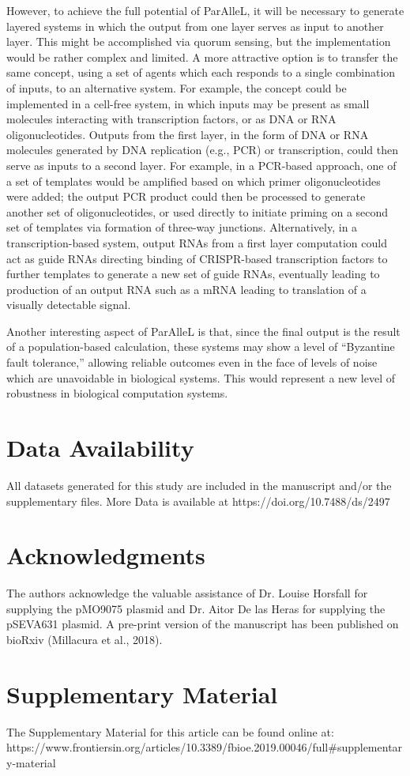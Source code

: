 However, to achieve the full potential of ParAlleL, it will be necessary to generate layered systems in which the output from one layer serves as input to another layer. This might be accomplished via quorum sensing, but the implementation would be rather complex and limited. A more attractive option is to transfer the same concept, using a set of agents which each responds to a single combination of inputs, to an alternative system. For example, the concept could be implemented in a cell-free system, in which inputs may be present as small molecules interacting with transcription factors, or as DNA or RNA oligonucleotides. Outputs from the first layer, in the form of DNA or RNA molecules generated by DNA replication (e.g., PCR) or transcription, could then serve as inputs to a second layer. For example, in a PCR-based approach, one of a set of templates would be amplified based on which primer oligonucleotides were added; the output PCR product could then be processed to generate another set of oligonucleotides, or used directly to initiate priming on a second set of templates via formation of three-way junctions. Alternatively, in a transcription-based system, output RNAs from a first layer computation could act as guide RNAs directing binding of CRISPR-based transcription factors to further templates to generate a new set of guide RNAs, eventually leading to production of an output RNA such as a mRNA leading to translation of a visually detectable signal.

Another interesting aspect of ParAlleL is that, since the final output is the result of a population-based calculation, these systems may show a level of “Byzantine fault tolerance,” allowing reliable outcomes even in the face of levels of noise which are unavoidable in biological systems. This would represent a new level of robustness in biological computation systems.

\section{\textbf{Data Availability}}
All datasets generated for this study are included in the manuscript and/or the supplementary files. More Data is available at https://doi.org/10.7488/ds/2497

\section{\textbf{Acknowledgments}}

The authors acknowledge the valuable assistance of Dr. Louise Horsfall for supplying the pMO9075 plasmid and Dr. Aitor De las Heras for supplying the pSEVA631 plasmid. A pre-print version of the manuscript has been published on bioRxiv (Millacura et al., 2018).
\section{\textbf{Supplementary Material}}

The Supplementary Material for this article can be found online at: https://www.frontiersin.org/articles/10.3389/fbioe.2019.00046/full\#supplementary-material
